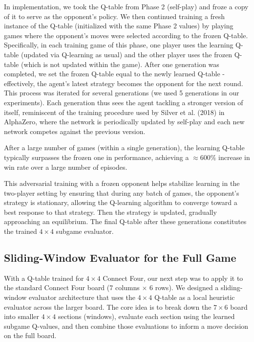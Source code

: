 \documentclass[10pt]{extarticle}
\begin{document}
In implementation, we took the Q-table from Phase 2 (self-play) and froze a copy of it to serve as the opponent's policy. We then continued training a fresh instance of the Q-table (initialized with the same Phase 2 values) by playing games where the opponent's moves were selected according to the frozen Q-table. Specifically, in each training game of this phase, one player uses the learning Q-table (updated via Q-learning as usual) and the other player uses the frozen Q-table (which is not updated within the game). After one generation was completed, we set the frozen Q-table equal to the newly learned Q-table - effectively, the agent's latest strategy becomes the opponent for the next round. This process was iterated for several generations (we used 5 generations in our experiments). Each generation thus sees the agent tackling a stronger version of itself, reminiscent of the training procedure used by Silver et al. (2018) in AlphaZero, where the network is periodically updated by self-play and each new network competes against the previous version. 

After a large number of games (within a single generation), the learning Q-table typically surpasses the frozen one in performance, achieving a $\approx 600\%$ increase in win rate over a large number of episodes.

This adversarial training with a frozen opponent helps stabilize learning in the two-player setting by ensuring that during any batch of games, the opponent's strategy is stationary, allowing the Q-learning algorithm to converge toward a best response to that strategy. Then the strategy is updated, gradually approaching an equilibrium. The final Q-table after these generations constitutes the trained $4 \times 4$ subgame evaluator.

\subsection{Sliding-Window Evaluator for the Full Game}

With a Q-table trained for $4 \times 4$ Connect Four, our next step was to apply it to the standard Connect Four board (7 columns $\times$ 6 rows). We designed a sliding-window evaluator architecture that uses the $4 \times 4$ Q-table as a local heuristic evaluator across the larger board. The core idea is to break down the $7 \times 6$ board into smaller $4 \times 4$ sections (windows), evaluate each section using the learned subgame Q-values, and then combine those evaluations to inform a move decision on the full board.
\end{document}
